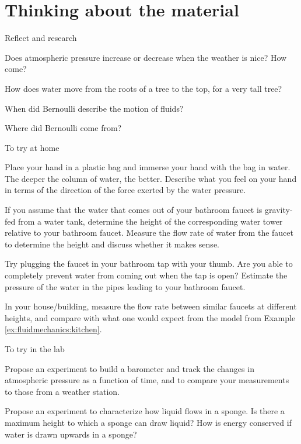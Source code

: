 {{\section{Thinking about the material}
\vspace{-1.6cm}
\begin{chapteractivity}{Reflect and research}
{
\item Does atmospheric pressure increase or decrease when the weather is nice? How come?
\item How does water move from the roots of a tree to the top, for a very tall tree?
\item When did Bernoulli describe the motion of fluids?
\item Where did Bernoulli come from?
}
\end{chapteractivity}
\vspace{-0.25cm}
\begin{chapteractivity}{To try at home}
{
\item Place your hand in a plastic bag and immerse your hand with the bag in water. The deeper the column of water, the better. Describe what you feel on your hand in terms of the direction of the force exerted by the water pressure.
\item If you assume that the water that comes out of your bathroom faucet is gravity-fed from a water tank, determine the height of the corresponding water tower relative to your bathroom faucet. Measure the flow rate of water from the faucet to determine the height and discuss whether it makes sense. 
\item Try plugging the faucet in your bathroom tap with your thumb. Are you able to completely prevent water from coming out when the tap is open? Estimate the pressure of the water in the pipes leading to your bathroom faucet.
\item In your house/building, measure the flow rate between similar faucets at different heights, and compare with what one would expect from the model from Example \ref{ex:fluidmechanics:kitchen}.
}
\end{chapteractivity}
\vspace{-0.25cm}
\begin{chapteractivity}{To try in the lab}
{
\item Propose an experiment to build a barometer and track the changes in atmospheric pressure as a function of time, and to compare your measurements to those from a weather station. 
\item Propose an experiment to characterize how liquid flows in a sponge. Is there a maximum height to which a sponge can draw liquid? How is energy conserved if water is drawn upwards in a sponge?
}
\end{chapteractivity}}}
